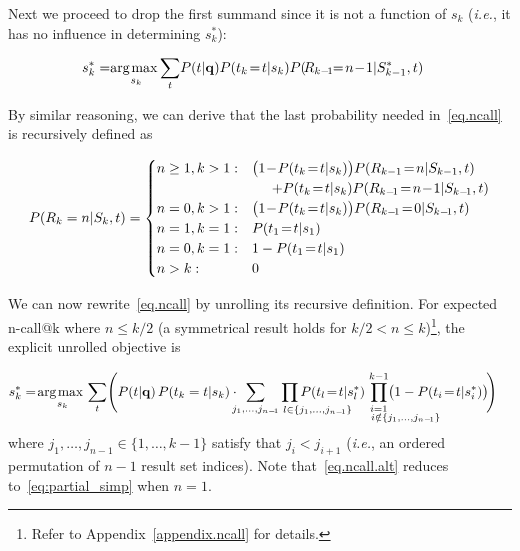 Next we proceed to drop the first summand since it is not a function of $s_k$ (\emph{i.e.},
it has no influence in determining $s_k^*$):

\begin{align}
s_k^* = & \argmax_{s_k} \!\sum_{t} \!P(t|\vec{q}) P(t_k\!=\!t|s_k) P(\!R_{k-\!1}\!\!=\!n\!-\!1|S_{k-1}^*, t) \label{eq.ncall}
\end{align}

By similar reasoning, we can derive that the last probability 
needed in~\eqref{eq.ncall} is recursively defined as 

\begin{align*}
P(R_k=n|S_k,t)=
\begin{cases}
n \geq 1, k > 1:  &  \bigl( 1\!-\!P(t_k\!=\!t|s_k) \bigr) P(R_{k-1}\!=\!n|S_{k-1},t) \nonumber \\
  & \hspace{5mm} + P(t_k\!=\!t|s_k) P(R_{k-\!1}\!=\!n\!-\!1|S_{k-\!1},t) \\
n = 0, k > 1:   & \bigl( 1\!-\!P(t_k\!=\!t|s_k) \bigr) P(R_{k-\!1}\!=\!0|S_{k-\!1},t) \\
n = 1, k = 1:   & P(t_1\!=\!t|s_1) \\
n = 0, k = 1:   & 1 - P(t_1\!=\!t|s_1) \\
n > k:			& 0
\end{cases}
\end{align*}

We can now rewrite~\eqref{eq.ncall} by unrolling its recursive definition.
For expected n-call@k where $n \leq k/2$ %
(a symmetrical result holds for $k/2 < n \leq k$)\footnote{Refer to Appendix~\ref{appendix.ncall} for details.}, the explicit unrolled objective is 

\begin{align}
  & s_k^* = \argmax_{s_k} \sum_t \Biggl( P(t|\vec{q}) \, P(t_k=t|s_k) \cdot \hspace{-2mm} \sum_{j_1, \dots, j_{n-\!1}} \hspace{-14mm} \prod_{\hspace{14.5mm} l \in \{j_1, \dots, j_{n-\!1}\}} \hspace{-14mm} P(t_l\!=\!t|s_l^*) \hspace{-13mm} \prod_{\substack{i=1 \\ \hspace{14mm} i \notin \{j_1, \dots, j_{n-\!1}\}}}^{k-1} \hspace{-13mm} \!\bigl( 1 - P(t_i\!=\!t|s_i^*) \bigr) \!\Biggr) \label{eq.ncall.alt}
\end{align}
where $j_1, \dots, j_{n-1} \in \{1,\ldots,k-1\}$ satisfy 
that $j_i < j_{i+1}$ (\emph{i.e.},
an ordered permutation of $n-1$ result set indices).
Note that~\eqref{eq.ncall.alt} reduces to~\eqref{eq:partial_simp} when $n=1$.

